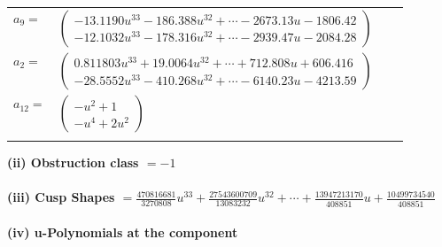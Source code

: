 \documentclass[1p]{elsarticle_modified}
\theoremstyle{definition}
\begin{document}
\begin{tabular}{m{7pt} m{180pt} m{7pt} m{180pt} }
\flushright $a_{9}=$&$\begin{pmatrix}-13.1190 u^{33}-186.388 u^{32}+\cdots-2673.13 u-1806.42\\-12.1032 u^{33}-178.316 u^{32}+\cdots-2939.47 u-2084.28\end{pmatrix}$ \\
\flushright $a_{2}=$&$\begin{pmatrix}0.811803 u^{33}+19.0064 u^{32}+\cdots+712.808 u+606.416\\-28.5552 u^{33}-410.268 u^{32}+\cdots-6140.23 u-4213.59\end{pmatrix}$ \\
\flushright $a_{12}=$&$\begin{pmatrix}- u^2+1\\- u^4+2 u^2\end{pmatrix}$\\&\end{tabular}
\flushleft \textbf{(ii) Obstruction class $= -1$}\\~\\
\flushleft \textbf{(iii) Cusp Shapes $= \frac{470816681}{3270808} u^{33}+\frac{27543600709}{13083232} u^{32}+\cdots+\frac{13947213170}{408851} u+\frac{10499734540}{408851}$}\\~\\
\newpage\renewcommand{\arraystretch}{1}
\flushleft \textbf{(iv) u-Polynomials at the component}\newline \\
\end{document}
